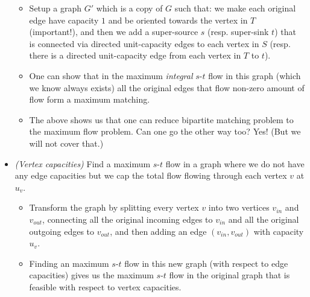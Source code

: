 \documentclass{article}
\begin{document}
\begin{itemize}
\begin{itemize}
\item Setup a graph $G'$ which is a copy of $G$ such that: we make each original edge have capacity $1$ and be oriented towards the vertex in $T$ (important!), and then we add a super-source $s$ (resp. super-sink $t$) that is connected via directed unit-capacity edges to each vertex in $S$ (resp. there is a directed unit-capacity edge from each vertex in $T$ to $t$).
\item One can show that in the maximum {\em integral} $s$-$t$ flow in this graph (which we know always exists) all the original edges that flow non-zero amount of flow form a maximum matching. 

\item The above shows us that one can reduce bipartite matching problem to the maximum flow problem. Can one go the other way too? Yes! (But we will not cover that.)
\end{itemize}

\item {\em (Vertex capacities)} Find a maximum $s$-$t$ flow in a graph where we do not have any edge capacities but we cap the total flow flowing through each vertex $v$ at $u_v$. 

\begin{itemize}
\item Transform the graph by splitting every vertex $v$ into two vertices $v_{in}$ and $v_{out}$, connecting all the original incoming edges to $v_{in}$ and all the original outgoing edges to $v_{out}$, and then adding an edge $(v_{in}, v_{out})$ with capacity $u_v$. 

\item Finding an maximum $s$-$t$ flow in this new graph (with respect to edge capacities) gives us the maximum $s$-$t$ flow in the original graph that is feasible with respect to vertex capacities.
\end{itemize}


\end{itemize}

\fi

\end{document}
